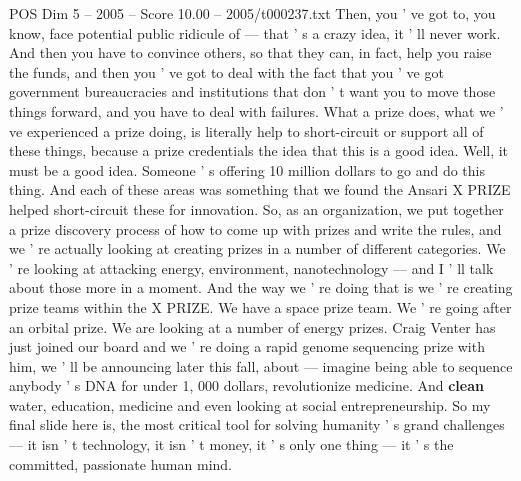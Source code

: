 \begin{textsample}{POS Dim 5 – 2005 – Score 10.00 – 2005/t000237.txt}
Then, you ' ve got to, you know, face potential public ridicule of — that ' s a crazy idea, it ' ll never work.
And then you have to convince others, so that they can, in fact, help you raise the funds, and then you ' ve got to deal with the fact that you ' ve got government bureaucracies and institutions that don ' t want you to move those things forward, and you have to deal with failures.
What a prize does, what we ' ve experienced a prize doing, is literally help to short-circuit or support all of these things, because a prize credentials the idea that this is a good idea.
Well, it must be a good idea.
Someone ' s offering 10 million dollars to go and do this thing.
And each of these areas was something that we found the Ansari X PRIZE helped short-circuit these for innovation.
So, as an organization, we put together a prize discovery process of how to come up with prizes and write the rules, and we ' re actually looking at creating prizes in a number of different categories.
We ' re looking at attacking energy, environment, nanotechnology — and I ' ll talk about those more in a moment.
And the way we ' re doing that is we ' re creating prize teams within the X PRIZE.
We have a space prize team.
We ' re going after an orbital prize.
We are looking at a number of energy prizes.
Craig Venter has just joined our board and we ' re doing a rapid genome sequencing prize with him, we ' ll be announcing later this fall, about — imagine being able to sequence anybody ' s DNA for under 1, 000 dollars, revolutionize medicine.
And \textbf{clean} water, education, medicine and even looking at social entrepreneurship.
So my final slide here is, the most critical tool for solving humanity ' s grand challenges — it isn ' t technology, it isn ' t money, it ' s only one thing — it ' s the committed, passionate human mind.

\end{textsample}
